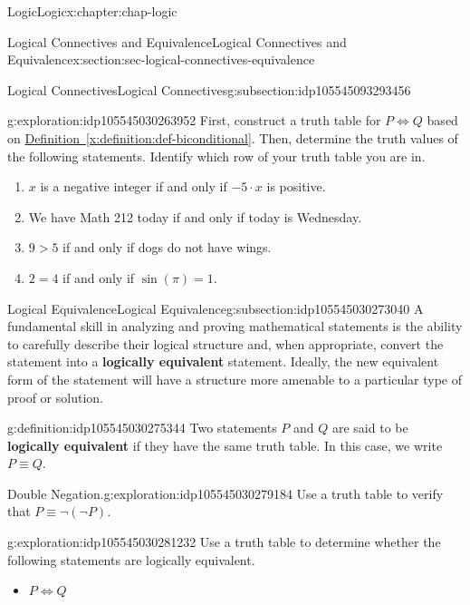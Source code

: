 \documentclass[oneside,10pt,]{book}
\newcommand{\xreffont}{\relax}
\newcommand{\terminology}[1]{\textbf{#1}}
\begin{document}
\begin{chapterptx}{Logic}{}{Logic}{}{}{x:chapter:chap-logic}
\begin{sectionptx}{Logical Connectives and Equivalence}{}{Logical Connectives and Equivalence}{}{}{x:section:sec-logical-connectives-equivalence}
\begin{subsectionptx}{Logical Connectives}{}{Logical Connectives}{}{}{g:subsection:idp105545093293456}
\begin{exploration}{}{g:exploration:idp105545030263952}%
First, construct a truth table for \(P\Leftrightarrow Q\) based on \hyperref[x:definition:def-biconditional]{Definition~{\xreffont\ref{x:definition:def-biconditional}}}. Then, determine the truth values of the following statements. Identify which row of your truth table you are in.%
%
\begin{enumerate}
\item{}\(x\) is a negative integer if and only if \(-5\cdot x\) is positive.%
\item{}We have Math 212 today if and only if today is Wednesday.%
\item{}\(9 > 5\) if and only if dogs do not have wings.%
\item{}\(2=4\) if and only if \(\sin(\pi) = 1\).%
\end{enumerate}
\end{exploration}%
\end{subsectionptx}
%
%
\typeout{************************************************}
\typeout{************************************************}
%
\begin{subsectionptx}{Logical Equivalence}{}{Logical Equivalence}{}{}{g:subsection:idp105545030273040}
A fundamental skill in analyzing and proving mathematical statements is the ability to carefully describe their logical structure and, when appropriate, convert the statement into a \terminology{logically equivalent} statement. Ideally, the new equivalent form of the statement will have a structure more amenable to a particular type of proof or solution.%
\begin{definition}{}{g:definition:idp105545030275344}%
%
Two statements \(P\) and \(Q\) are said to be \terminology{logically equivalent} if they have the same truth table. In this case, we write \(P \equiv Q\).%
\end{definition}
\begin{exploration}{Double Negation.}{g:exploration:idp105545030279184}%
Use a truth table to verify that \(P\equiv \neg (\neg P)\).%
\end{exploration}%
\begin{exploration}{}{g:exploration:idp105545030281232}%
Use a truth table to determine whether the following statements are logically equivalent.%
%
\begin{itemize}[label=\textbullet]
\item{}\(\displaystyle P\Leftrightarrow Q\)%

\end{itemize}
\end{exploration}
\end{subsectionptx}
\end{sectionptx}
\end{chapterptx}
\end{document}
